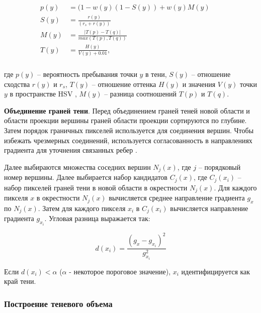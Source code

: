 \begin{equation}
	\begin{aligned}
		\begin{split}
			p(y) &= (1 - w(y)(1 - S(y)) + w(y)M(y) &&\\
			S(y) &= \frac{r(y)}{(r_s + r(y))} &&\\
			M(y) &= \frac{|T(p) - T(q)|}{max(T(p), T(q))} &&\\
			T(y) &= \frac{H(y)}{V(y) + 0.01}, &&\\
		\end{split}
	\end{aligned}
\end{equation}

где $p(y)$ -- вероятность пребывания точки $y$ в тени, $S(y)$ -- отношение сходства $r(y)$ и $r_s$, $T(y)$ -- отношение оттенка $H(y)$ и значения $V(y)$ точки $y$ в пространстве HSV \cite{cheng2001color}, $M(y)$ -- разница соотношений $T(p)$ и $T(q)$.

\textbf{Объединение граней тени}. Перед объединением граней теней новой области и области проекции вершины граней области проекции сортируются по глубине. Затем порядок граничных пикселей используется для соединения вершин. Чтобы избежать чрезмерных соединений, используется согласованность в направлениях градиента для уточнения связанных ребер \cite{wei2019simulating}.

Далее выбираются множества соседних вершин $N_j(x)$, где $j$ -- порядковый номер вершины. Далее выбирается набор кандидатов $C_j(x)$, где $C_j(x_i)$ -- набор пикселей граней тени в новой области в окрестности $N_j(x)$. Для каждого пикселя $x$ в окрестности $N_j(x)$ вычисляется среднее направление градиента $g_x$ по $N_j(x)$. Затем для каждого пикселя $x_i$ в $C_j(x_i)$ вычисляется направление градиента $g_{x_i}$. Угловая разница выражается так:

\begin{equation}
	d(x_i) = \frac{(g_x - g_{x_i}) ^ 2}{g_{x_i} ^ 2}
\end{equation}

Если $d(x_i) < \alpha$ ($\alpha$ - некоторое пороговое значение), $x_i$ идентифицируется как край тени.

\subsubsection*{Построение теневого объема}

